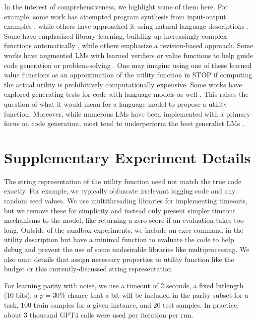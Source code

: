\documentclass{article}
\begin{document}
In the interest of comprehensiveness, we highlight some of them here. For example, some work has attempted program synthesis from input-output examples \citep{bauer1979programming,gulwani2016programming,ellis2021dreamcoder,bowers2022top,jain2021jigsaw}, while others have approached it using natural language descriptions \citep{raza2015compositional,yin2017syntactic,desai2016program}. Some have emphasized library learning, building up increasingly complex functions automatically \citep{bowers2022top}, while others emphasize a revision-based approach. Some works have augmented LMs with learned verifiers or value functions to help guide code generation or problem-solving \citep{polu2020generative,cobbe2021training,ni2023lever,zhang2023planning}. One may imagine using one of these learned value functions as an approximation of the utility function in STOP if computing the actual utility is prohibitively computationally expensive. Some works have explored generating tests for code with language models as well \citep{chen2022codet}. This raises the question of what it would mean for a language model to propose a utility function. Moreover, while numerous LMs have been implemented with a primary focus on code generation, most tend to underperform the best generalist LMs \citep{li2022competition,le2022coderl,roziere2023code,austin2021program,xu2022systematic}.

\section{Supplementary Experiment Details}\label{ap:nuances}

The string representation of the utility function need not match the true code exactly. For example, we typically obfuscate irrelevant logging code and any random seed values. We use multithreading libraries for implementing timeouts, but we remove these for simplicity and instead only present simpler timeout mechanisms to the model, like returning a zero score if an evaluation takes too long. Outside of the sandbox experiments, we include an exec command in the utility description but have a minimal function to evaluate the code to help debug and prevent the use of some undesirable libraries like multiprocessing. We also omit details that assign necessary properties to utility function like the budget or this currently-discussed string representation.

For learning parity with noise, we use a timeout of 2 seconds, a fixed bitlength (10 bits), a $p=30\%$ chance that a bit will be included in the parity subset for a task, 100 train samples for a given instance, and 20 test samples. In practice, about 3 thousand GPT4 calls were used per iteration per run.
\end{document}
